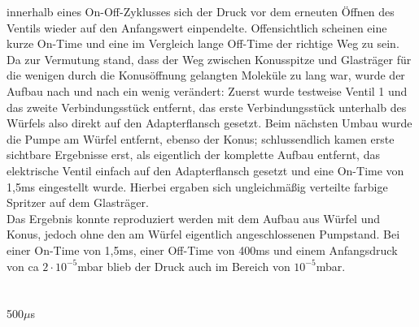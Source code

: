 innerhalb eines On-Off-Zyklusses sich der Druck vor dem erneuten Öffnen des Ventils wieder auf den
Anfangswert einpendelte. Offensichtlich scheinen eine kurze On-Time und eine im Vergleich lange
Off-Time der richtige Weg zu sein.\\
Da zur Vermutung stand, dass der Weg zwischen Konusspitze und Glasträger für die wenigen durch die
Konusöffnung gelangten Moleküle zu lang war, wurde der Aufbau nach und nach ein wenig verändert:
Zuerst wurde testweise Ventil 1 und das zweite Verbindungsstück entfernt, das erste Verbindungsstück
unterhalb des Würfels also direkt auf den Adapterflansch gesetzt. Beim nächsten Umbau wurde die
Pumpe am Würfel entfernt, ebenso der Konus; schlussendlich kamen erste sichtbare Ergebnisse erst,
als eigentlich der komplette Aufbau entfernt, das elektrische Ventil einfach auf den
Adapterflansch gesetzt und eine On-Time von 1,5ms eingestellt wurde. Hierbei ergaben sich
ungleichmäßig verteilte farbige Spritzer auf dem Glasträger.\\
Das Ergebnis konnte reproduziert werden mit dem Aufbau aus Würfel und Konus, jedoch ohne den am
Würfel eigentlich angeschlossenen Pumpstand. Bei einer On-Time von 1,5ms, einer Off-Time von
400ms und einem Anfangsdruck von ca $2\cdot10^{-5}$mbar blieb der Druck auch im Bereich von
$10^{-5}$mbar.\\


\\
\\
 500$\mu$s
 































